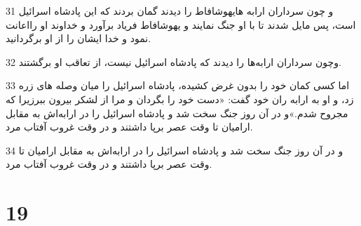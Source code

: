 \par 31 و چون سرداران ارابه هایهوشافاط را دیدند گمان بردند که این پادشاه اسرائیل است، پس مایل شدند تا با او جنگ نمایند و یهوشافاط فریاد برآورد و خداوند او رااعانت نمود و خدا ایشان را از او برگردانید.
\par 32 وچون سرداران ارابه‌ها را دیدند که پادشاه اسرائیل نیست، از تعاقب او برگشتند.
\par 33 اما کسی کمان خود را بدون غرض کشیده، پادشاه اسرائیل را میان وصله های زره زد، و او به ارابه ران خود گفت: «دست خود را بگردان و مرا از لشکر بیرون ببرزیرا که مجروح شدم.»و در آن روز جنگ سخت شد و پادشاه اسرائیل را در ارابه‌اش به مقابل ارامیان تا وقت عصر برپا داشتند و در وقت غروب آفتاب مرد.
\par 34 و در آن روز جنگ سخت شد و پادشاه اسرائیل را در ارابه‌اش به مقابل ارامیان تا وقت عصر برپا داشتند و در وقت غروب آفتاب مرد.
 
\chapter{19}

